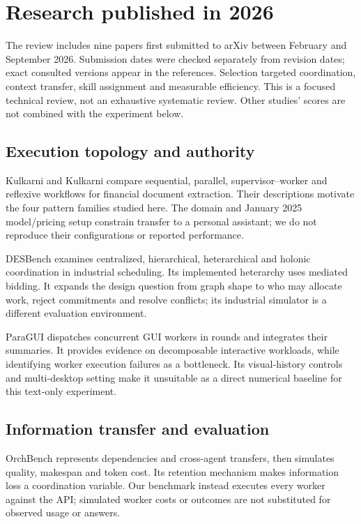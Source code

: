 \section{Research published in 2026}
The review includes nine papers first submitted to arXiv between February and September 2026. Submission dates were checked separately from revision dates; exact consulted versions appear in the references. Selection targeted coordination, context transfer, skill assignment and measurable efficiency. This is a focused technical review, not an exhaustive systematic review. Other studies' scores are not combined with the experiment below.

\subsection{Execution topology and authority}
Kulkarni and Kulkarni compare sequential, parallel, supervisor--worker and reflexive workflows for financial document extraction. Their descriptions motivate the four pattern families studied here. The domain and January 2025 model/pricing setup constrain transfer to a personal assistant; we do not reproduce their configurations or reported performance.

DESBench examines centralized, hierarchical, heterarchical and holonic coordination in industrial scheduling. Its implemented heterarchy uses mediated bidding. It expands the design question from graph shape to who may allocate work, reject commitments and resolve conflicts; its industrial simulator is a different evaluation environment.

ParaGUI dispatches concurrent GUI workers in rounds and integrates their summaries. It provides evidence on decomposable interactive workloads, while identifying worker execution failures as a bottleneck. Its visual-history controls and multi-desktop setting make it unsuitable as a direct numerical baseline for this text-only experiment.

\subsection{Information transfer and evaluation}
OrchBench represents dependencies and cross-agent transfers, then simulates quality, makespan and token cost. Its retention mechanism makes information loss a coordination variable. Our benchmark instead executes every worker against the API; simulated worker costs or outcomes are not substituted for observed usage or answers.


